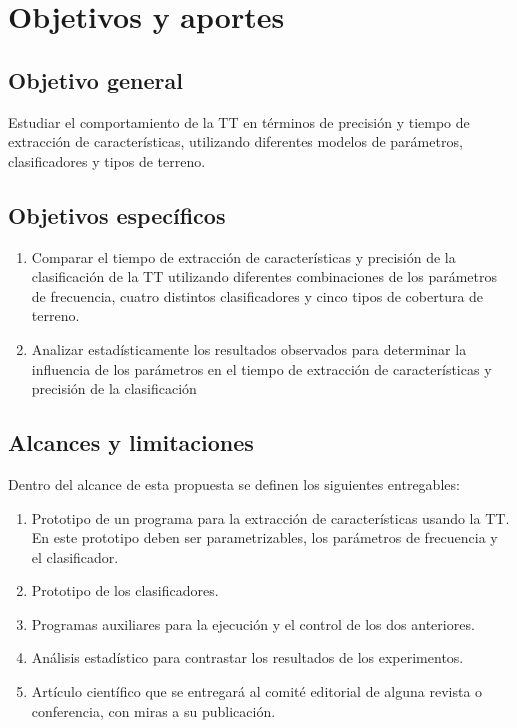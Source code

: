\chapter{Objetivos y aportes}

\section{Objetivo general}

Estudiar el comportamiento de la TT en términos de precisión y tiempo de extracción de características, utilizando diferentes modelos de parámetros, clasificadores y tipos de terreno.

\section{Objetivos específicos}

\begin{enumerate}
    \item Comparar el tiempo de extracción de características y precisión de la clasificación de la TT utilizando diferentes combinaciones de los parámetros de frecuencia, cuatro distintos clasificadores y cinco tipos de cobertura de terreno.
    \item Analizar estadísticamente los resultados observados para determinar la influencia de los parámetros en el tiempo de extracción de características y precisión de la clasificación
\end{enumerate}
    
    
\section{Alcances y limitaciones}

Dentro del alcance de esta propuesta se definen los siguientes entregables:
\begin{enumerate}
    \item Prototipo de un programa para la extracción de características usando la TT. En este prototipo deben ser parametrizables, los parámetros de frecuencia y el clasificador.
    \item Prototipo de los clasificadores.
    \item Programas auxiliares para la ejecución y el control de los dos anteriores.
    \item Análisis estadístico para contrastar los resultados de los experimentos.
    \item Artículo científico que se entregará al comité editorial de alguna revista o conferencia, con miras a su publicación.
\end{enumerate}

